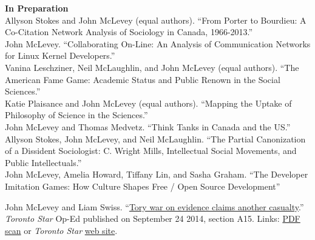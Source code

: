 \documentclass[11pt,usenames,dvipsnames]{article}
\begin{document}

\ind \textbf{In Preparation} \\

\ind Allyson Stokes and John McLevey (equal authors). ``From Porter to Bourdieu: A Co-Citation Network Analysis of Sociology in Canada, 1966-2013.'' \\

\ind John McLevey. ``Collaborating On-Line: An Analysis of Communication Networks for Linux Kernel Developers.'' \\

\ind Vanina Leschziner, Neil McLaughlin, and John McLevey (equal authors). ``The American Fame Game: Academic Status and Public Renown in the Social Sciences.'' \\ 

\ind Katie Plaisance and John McLevey (equal authors). ``Mapping the Uptake of Philosophy of Science in the Sciences.'' \\

\ind John McLevey and Thomas Medvetz. ``Think Tanks in Canada and the US.'' \\

\ind Allyson Stokes, John McLevey, and Neil McLaughlin. ``The Partial Canonization of a Dissident Sociologist: C. Wright Mills, Intellectual Social Movements, and Public Intellectuals.'' \\ %

\ind John McLevey, Amelia Howard, Tiffany Lin, and Sasha Graham. ``The Developer Imitation Games: How Culture Shapes Free / Open Source Development'' \\




\noindent John McLevey and Liam Swiss. ``\href{http://bit.ly/1ohSn1N}{Tory war on evidence claims another casualty}.'' \emph{Toronto Star} Op-Ed published on September 24 2014, section A15. Links: \href{http://bit.ly/1ohSn1N}{PDF scan} or \emph{Toronto Star} \href{http://on.thestar.com/1vbUGbU}{web site}. \\  
\end{document}

